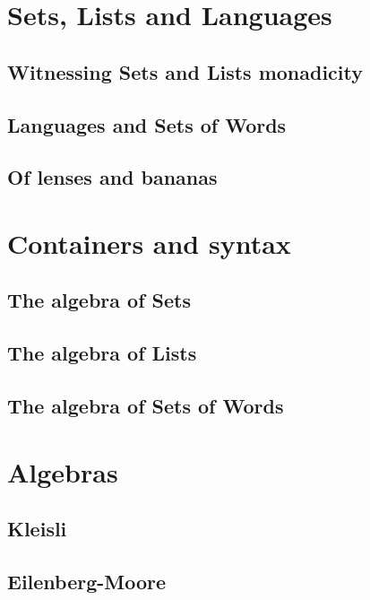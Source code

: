 \section{Sets, Lists and Languages}

\subsection{Witnessing Sets and Lists monadicity}

\subsection{Languages and Sets of Words}

\subsection{Of lenses and bananas}

\section{Containers and syntax}

\subsection{The algebra of Sets}

\subsection{The algebra of Lists}

\subsection{The algebra of Sets of Words}

\section{Algebras}

\subsection{Kleisli}

\subsection{Eilenberg-Moore}